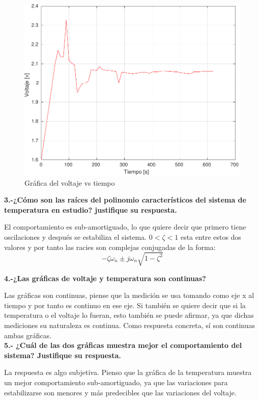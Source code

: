\begin{figure}[H]
	\centering
	\includegraphics[width=0.7\linewidth]{img2/Grafica2}
	\caption{Gráfica del voltaje vs tiempo}
	\label{fig:grafica1}
\end{figure}

\textbf{3.-¿Cómo son las raíces del polinomio característicos del sistema de temperatura en estudio? justifique su respuesta.}

El comportamiento es sub-amortiguado, lo que quiere decir que primero tiene oscilaciones y después se estabiliza el sistema. $0<\zeta <1$ esta entre estos dos valores y por tanto las racies son complejas conjugadas de la forma:
$$-\zeta \omega_{n} \pm j \omega_{n} \sqrt{1-\zeta^{2}}$$

\textbf{4.-¿Las gráficas de voltaje y temperatura son continuas?}

Las gráficas son continuas, piense que la medición se usa tomando como eje x al tiempo y por tanto es continuo en ese eje. Si también se quiere decir que si la temperatura o el voltaje lo fueran, esto también se puede afirmar, ya que dichas mediciones su naturaleza es continua.
Como respuesta concreta, sí son continuas ambas gráficas.\\


\textbf{5.- ¿Cuál de las dos gráficas muestra mejor el comportamiento del sistema? Justifique su respuesta.}

La respuesta es algo subjetiva. Pienso que la gráfica de la temperatura muestra un mejor comportamiento sub-amortiguado, ya que las variaciones  para estabilizarse son menores y más predecibles que las variaciones del voltaje.


